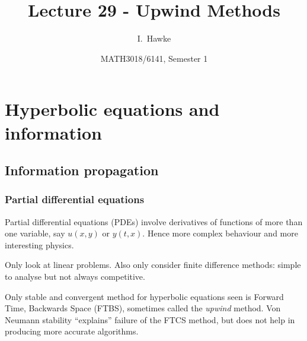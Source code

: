 \documentclass{beamer}
\title[Lecture 29] %
{Lecture 29 - Upwind Methods}
\author[I. Hawke] %
{I.~Hawke}
\institute[University of Southampton] %
{
  School of Mathematics, \\
  University of Southampton, UK
}
\date[Semester 1] %
{MATH3018/6141, Semester 1}
\begin{document}
\begin{frame}
  \titlepage
\end{frame}

\section{Hyperbolic equations and information}

\subsection{Information propagation}

\begin{frame}
  \frametitle{Partial differential equations}

  Partial differential equations (PDEs) involve derivatives of
  functions of more than one variable, say $u(x, y)$ or $y(t,
  x)$. Hence more complex behaviour and more interesting
  physics. \pause

  \vspace{1ex}

  Only look at linear problems.  Also only consider finite difference
  methods: simple to analyse but not always competitive. \pause

  \vspace{1ex}

  Only stable and convergent method for hyperbolic equations seen is
  Forward Time, Backwards Space (FTBS), sometimes called the
  \emph{upwind} method. Von Neumann stability ``explains'' failure of
  the FTCS method, but does not help in producing more accurate
  algorithms.

\end{frame}
\end{document}
